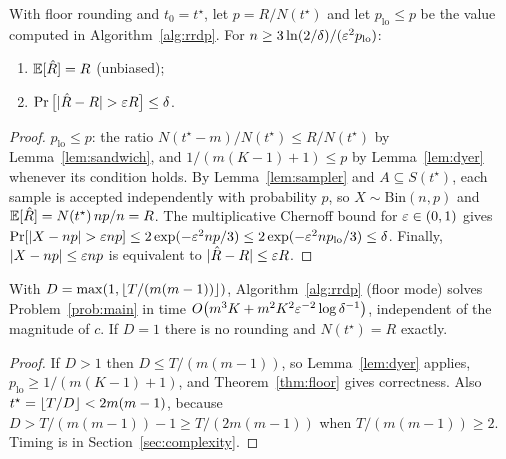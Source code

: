 \begin{theorem}\label{thm:floor}
With floor rounding and $t_0=t^\star$, let $p=R/N(t^\star)$ and let $p_{\mathrm{lo}}\le p$ be the value
computed in Algorithm~\ref{alg:rrdp}. For $n\ge3\ln(2/\delta)/(\varepsilon^2p_{\mathrm{lo}})$:
\begin{enumerate}[nosep]
\item $\mathbb{E}[\hat R]=R$ (unbiased);
\item $\Pr\big[|\hat R-R|>\eps R\big]\le\delta$.
\end{enumerate}
\end{theorem}
\begin{proof}
$p_{\mathrm{lo}}\le p$: the ratio $N(t^\star-m)/N(t^\star)\le R/N(t^\star)$ by Lemma~\ref{lem:sandwich}, and $1/(m(K-1)+1)\le p$ by
Lemma~\ref{lem:dyer} whenever its condition holds. By Lemma~\ref{lem:sampler} and $A\subseteq S(t^\star)$, each sample is accepted
independently with probability $p$, so $X\sim\mathrm{Bin}(n,p)$ and $\mathbb{E}[\hat R]=N(t^\star)\,np/n=R$.
The multiplicative Chernoff bound for $\varepsilon\in(0,1)$ gives
$\Pr[|X-np|>\eps np]\le2\exp(-\eps^2np/3)\le2\exp(-\eps^2np_{\mathrm{lo}}/3)\le\delta$.
Finally, $|X-np|\le\varepsilon np$ is equivalent to $|\hat R-R|\le\varepsilon R$.
\end{proof}

\begin{corollary}\label{cor:fpras}
With $D=\max(1,\lfloor T/(m(m-1))\rfloor)$, Algorithm~\ref{alg:rrdp} (floor mode) solves Problem~\ref{prob:main}
in time $O\big(m^3K+m^2K^2\varepsilon^{-2}\log\delta^{-1}\big)$, independent of the magnitude of $c$.
If $D=1$ there is no rounding and $N(t^\star)=R$ exactly.
\end{corollary}
\begin{proof}
If $D>1$ then $D\le T/(m(m-1))$, so Lemma~\ref{lem:dyer} applies, $p_{\mathrm{lo}}\ge1/(m(K-1)+1)$, and Theorem~\ref{thm:floor} gives
correctness. Also $t^\star=\lfloor T/D\rfloor<2m(m-1)$, because $D>T/(m(m-1))-1\ge T/(2m(m-1))$ when $T/(m(m-1))\ge2$.
Timing is in Section~\ref{sec:complexity}.
\end{proof}

